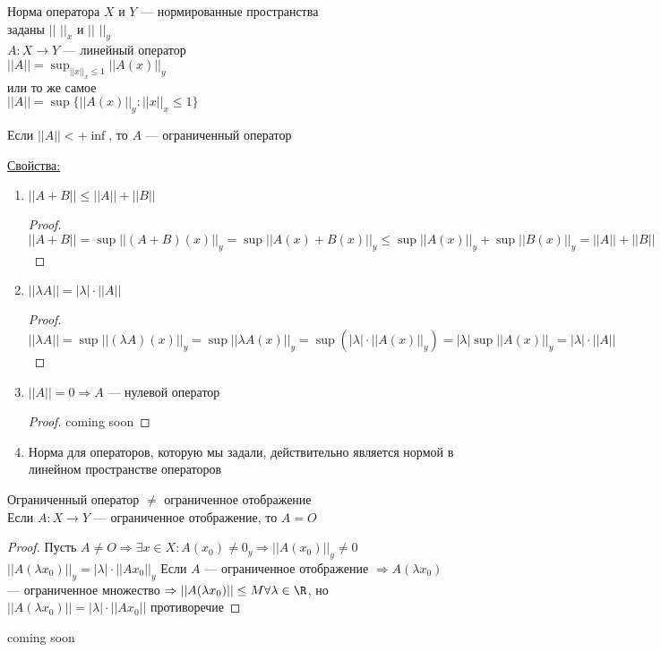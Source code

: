 \begin{Def}
Норма оператора
$X$ и $Y$ --- нормированные пространства \\
заданы $||$ $||_x$ и $||$ $||_y$ \\
$A \colon X \rightarrow Y$ --- линейный оператор \\
$||A|| = \sup_{||x||_x \le 1} ||A(x)||_y$\\
или то же самое\\
$||A|| = \sup \{||A(x)||_y \colon ||x||_x \le 1\}$
\end{Def}
\begin{Def}
Если $||A||  < +\inf$, то $A$ --- ограниченный оператор
\end{Def}
\underline{Свойства:}
\begin{enumerate}
\item $||A + B|| \le ||A|| + ||B||$
\begin{proof}
$||A + B|| = \sup ||(A + B)(x)||_y = \sup ||A(x) + B(x)||_y \le \sup ||A(x)||_y + \sup ||B(x)||_y = ||A|| + ||B||$
\end{proof}
\item $||\lambda A|| = |\lambda| \cdot ||A||$
\begin{proof}
$||\lambda A|| = \sup || (\lambda A)(x) ||_y = \sup || \lambda A(x) ||_y = \sup( |\lambda| \cdot ||A(x) ||_y) = |\lambda| \sup ||A(x)||_y = |\lambda| \cdot ||A||$
\end{proof}
\item $||A|| = 0 \Rightarrow A$ --- нулевой оператор
\begin{proof}
coming soon
\end{proof}
\item Норма для операторов, которую мы задали, действительно является нормой в линейном пространстве операторов
\end{enumerate}
\begin{Rem}
Ограниченный оператор $\neq$ ограниченное отображение\\
Если $A \colon X \rightarrow Y$ --- ограниченное отображение, то $A = O$
\end{Rem}
\begin{proof}
Пусть $A \neq O \Rightarrow \exists x \in X \colon A(x_0) \neq 0_y \Rightarrow ||A(x_0)||_y \neq 0$ \\
$||A(\lambda x_0)||_y = |\lambda| \cdot ||Ax_0||_y$
Если $A$ --- ограниченное отображение $\Rightarrow A(\lambda x_0)$ --- ограниченное множество $\Rightarrow ||A(\lambda x_0)|| \le M \forall \lambda \in \R$, но $||A(\lambda x_0)|| = |\lambda| \cdot ||Ax_0||$ противоречие
\end{proof}
coming soon